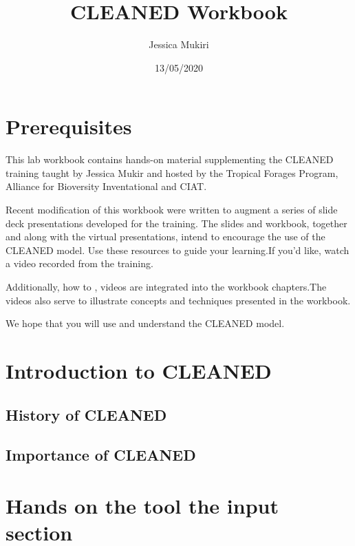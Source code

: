 \documentclass[
]{book}
\title{CLEANED Workbook}
\author{Jessica Mukiri}
\date{13/05/2020}
\begin{document}
\maketitle

{
\setcounter{tocdepth}{1}
\tableofcontents
}
\hypertarget{prerequisites}{%
\chapter*{Prerequisites}\label{prerequisites}}

This lab workbook contains hands-on material supplementing the CLEANED training taught by Jessica Mukir and hosted by the Tropical Forages Program, Alliance for Bioversity Inventational and CIAT.

Recent modification of this workbook were written to augment a series of slide deck presentations developed for the training. The slides and workbook, together and along with the virtual presentations, intend to encourage the use of the CLEANED model. Use these resources to guide your learning.If you'd like, watch a video recorded from the training.

Additionally, how to , videos are integrated into the workbook chapters.The videos also serve to illustrate concepts and techniques presented in the workbook.

We hope that you will use and understand the CLEANED model.

\hypertarget{intro}{%
\chapter{Introduction to CLEANED}\label{intro}}

\hypertarget{history-of-cleaned}{%
\section{History of CLEANED}\label{history-of-cleaned}}

\hypertarget{importance-of-cleaned}{%
\section{Importance of CLEANED}\label{importance-of-cleaned}}

\hypertarget{hands-on-the-tool-the-input-section}{%
\chapter{Hands on the tool the input section}\label{hands-on-the-tool-the-input-section}}
\end{document}
